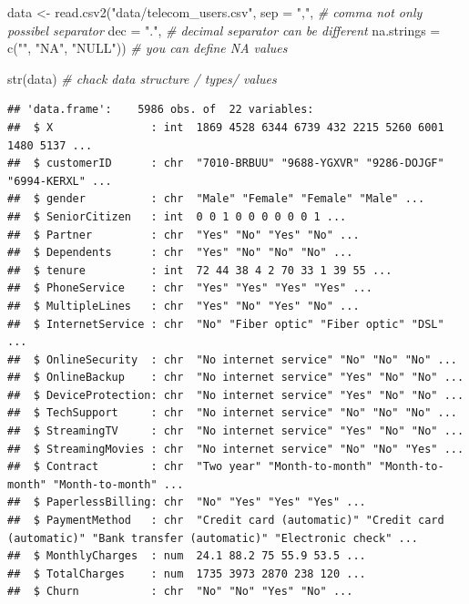 \documentclass[
]{book}
\newenvironment{Shaded}{\begin{snugshade}}{\end{snugshade}}
\newcommand{\AttributeTok}[1]{\textcolor[rgb]{0.77,0.63,0.00}{#1}}
\newcommand{\CommentTok}[1]{\textcolor[rgb]{0.56,0.35,0.01}{\textit{#1}}}
\newcommand{\FunctionTok}[1]{\textcolor[rgb]{0.00,0.00,0.00}{#1}}
\newcommand{\NormalTok}[1]{#1}
\newcommand{\OtherTok}[1]{\textcolor[rgb]{0.56,0.35,0.01}{#1}}
\newcommand{\StringTok}[1]{\textcolor[rgb]{0.31,0.60,0.02}{#1}}
\begin{document}
\begin{Shaded}
\begin{Highlighting}[]
\NormalTok{data }\OtherTok{\textless{}{-}} \FunctionTok{read.csv2}\NormalTok{(}\StringTok{"data/telecom\_users.csv"}\NormalTok{,}
                  \AttributeTok{sep =} \StringTok{","}\NormalTok{, }\CommentTok{\# comma not only possibel separator}
                  \AttributeTok{dec =} \StringTok{"."}\NormalTok{, }\CommentTok{\# decimal separator can be different}
                  \AttributeTok{na.strings =} \FunctionTok{c}\NormalTok{(}\StringTok{""}\NormalTok{, }\StringTok{"NA"}\NormalTok{, }\StringTok{"NULL"}\NormalTok{)) }\CommentTok{\# you can define NA values}
\end{Highlighting}
\end{Shaded}

\begin{Shaded}
\begin{Highlighting}[]
\FunctionTok{str}\NormalTok{(data) }\CommentTok{\# chack data structure / types/ values}
\end{Highlighting}
\end{Shaded}

\begin{verbatim}
## 'data.frame':    5986 obs. of  22 variables:
##  $ X               : int  1869 4528 6344 6739 432 2215 5260 6001 1480 5137 ...
##  $ customerID      : chr  "7010-BRBUU" "9688-YGXVR" "9286-DOJGF" "6994-KERXL" ...
##  $ gender          : chr  "Male" "Female" "Female" "Male" ...
##  $ SeniorCitizen   : int  0 0 1 0 0 0 0 0 0 1 ...
##  $ Partner         : chr  "Yes" "No" "Yes" "No" ...
##  $ Dependents      : chr  "Yes" "No" "No" "No" ...
##  $ tenure          : int  72 44 38 4 2 70 33 1 39 55 ...
##  $ PhoneService    : chr  "Yes" "Yes" "Yes" "Yes" ...
##  $ MultipleLines   : chr  "Yes" "No" "Yes" "No" ...
##  $ InternetService : chr  "No" "Fiber optic" "Fiber optic" "DSL" ...
##  $ OnlineSecurity  : chr  "No internet service" "No" "No" "No" ...
##  $ OnlineBackup    : chr  "No internet service" "Yes" "No" "No" ...
##  $ DeviceProtection: chr  "No internet service" "Yes" "No" "No" ...
##  $ TechSupport     : chr  "No internet service" "No" "No" "No" ...
##  $ StreamingTV     : chr  "No internet service" "Yes" "No" "No" ...
##  $ StreamingMovies : chr  "No internet service" "No" "No" "Yes" ...
##  $ Contract        : chr  "Two year" "Month-to-month" "Month-to-month" "Month-to-month" ...
##  $ PaperlessBilling: chr  "No" "Yes" "Yes" "Yes" ...
##  $ PaymentMethod   : chr  "Credit card (automatic)" "Credit card (automatic)" "Bank transfer (automatic)" "Electronic check" ...
##  $ MonthlyCharges  : num  24.1 88.2 75 55.9 53.5 ...
##  $ TotalCharges    : num  1735 3973 2870 238 120 ...
##  $ Churn           : chr  "No" "No" "Yes" "No" ...
\end{verbatim}
\end{document}
